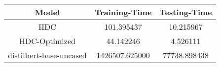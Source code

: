 \begin{tabular}{ccc}
\toprule
Model & Training-Time & Testing-Time \\
\midrule
HDC & 101.395437 & 10.215967 \\
HDC-Optimized & 44.142246 & 4.526111 \\
distilbert-base-uncased & 1426507.625000 & 77738.898438 \\
\bottomrule
\end{tabular}

